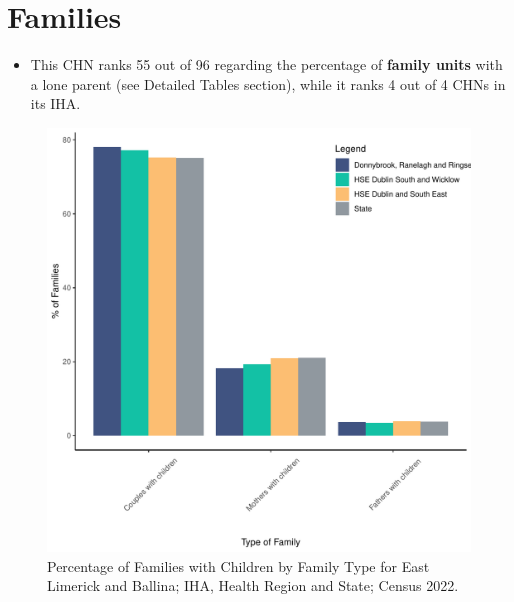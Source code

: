 \documentclass{article}
\begin{document}
\section{Families}\label{sect:Fam}
\begin{itemize}
\item This CHN ranks  55 out of 96 regarding the percentage of \textbf{family units} with a lone parent (see Detailed Tables section), while it ranks   4 out of 4 CHNs in its IHA.
\end{itemize}
\begin{figure}[H]
	\centering
	\includegraphics[width = 150mm]{../figures/FamED.pdf}
	\caption{Percentage of Families with Children by Family Type for East Limerick and Ballina; IHA, Health Region and State; Census 2022.}
	\label{fig:vbnv}
	\end{figure}
	
\end{document}

